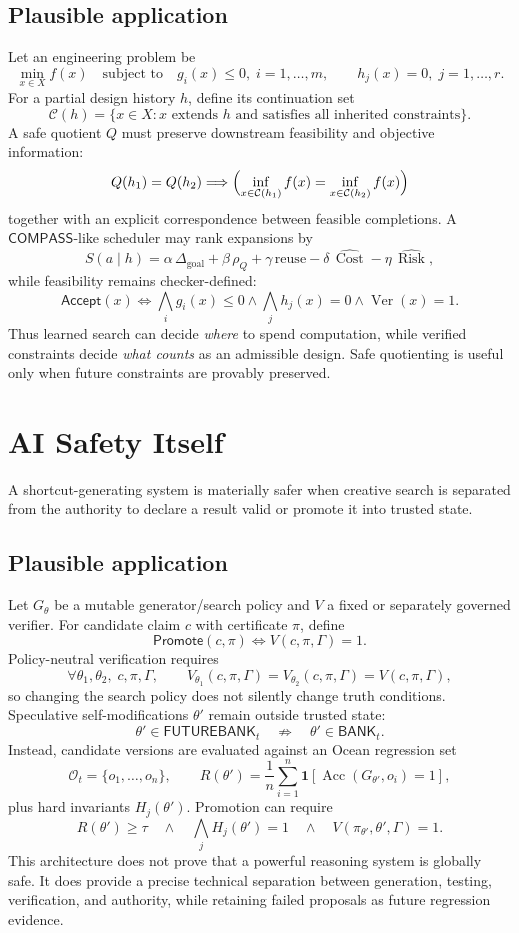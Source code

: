 \documentclass[11pt]{article}
\newcommand{\BANK}{\mathsf{BANK}}
\newcommand{\FB}{\mathsf{FUTUREBANK}}
\newcommand{\COMPASS}{\mathsf{COMPASS}}
\newcommand{\OCEAN}{\mathcal O}
\newcommand{\Acc}{\operatorname{Acc}}
\newcommand{\Ver}{\operatorname{Ver}}
\newcommand{\Cost}{\operatorname{Cost}}
\newcommand{\Risk}{\operatorname{Risk}}
\begin{document}
\subsection*{Plausible application}
Let an engineering problem be
\[
\min_{x\in X} f(x)
\quad\text{subject to}\quad
g_i(x)\le0,\;i=1,\dots,m,
\qquad
h_j(x)=0,\;j=1,\dots,r.
\]
For a partial design history \(h\), define its continuation set
\[
\mathcal C(h)=
\{x\in X:x\text{ extends }h\text{ and satisfies all inherited constraints}\}.
\]
A safe quotient \(Q\) must preserve downstream feasibility and objective information:
\[
Q(h_1)=Q(h_2)
\Longrightarrow
\Bigl(
\inf_{x\in\mathcal C(h_1)}f(x)
=
\inf_{x\in\mathcal C(h_2)}f(x)
\Bigr)
\]
together with an explicit correspondence between feasible completions. A \(\COMPASS\)-like scheduler
may rank expansions by
\[
S(a\mid h)=
\alpha\,\Delta_{\mathrm{goal}}
+\beta\,\rho_Q
+\gamma\,\mathrm{reuse}
-\delta\,\widehat{\Cost}
-\eta\,\widehat{\Risk},
\]
while feasibility remains checker-defined:
\[
\mathsf{Accept}(x)
\iff
\bigwedge_i g_i(x)\le0
\land
\bigwedge_j h_j(x)=0
\land
\Ver(x)=1.
\]
Thus learned search can decide \emph{where} to spend computation, while verified constraints decide
\emph{what counts} as an admissible design. Safe quotienting is useful only when future constraints are
provably preserved.

\section{AI Safety Itself}
A shortcut-generating system is materially safer when creative search is separated from the authority to
declare a result valid or promote it into trusted state.

\subsection*{Plausible application}
Let \(G_\theta\) be a mutable generator/search policy and \(V\) a fixed or separately governed verifier.
For candidate claim \(c\) with certificate \(\pi\), define
\[
\mathsf{Promote}(c,\pi)
\iff
V(c,\pi,\Gamma)=1.
\]
Policy-neutral verification requires
\[
\forall\theta_1,\theta_2,\;c,\pi,\Gamma,\qquad
V_{\theta_1}(c,\pi,\Gamma)=V_{\theta_2}(c,\pi,\Gamma)=V(c,\pi,\Gamma),
\]
so changing the search policy does not silently change truth conditions. Speculative self-modifications
\(\theta'\) remain outside trusted state:
\[
\theta'\in\FB_t
\quad\not\Rightarrow\quad
\theta'\in\BANK_t.
\]
Instead, candidate versions are evaluated against an Ocean regression set
\[
\OCEAN_t=\{o_1,\dots,o_n\},
\qquad
R(\theta')=\frac1n\sum_{i=1}^n
\mathbf 1\!\left[\Acc(G_{\theta'},o_i)=1\right],
\]
plus hard invariants \(H_j(\theta')\). Promotion can require
\[
R(\theta')\ge\tau
\quad\land\quad
\bigwedge_j H_j(\theta')=1
\quad\land\quad
V(\pi_{\theta'},\theta',\Gamma)=1.
\]
This architecture does not prove that a powerful reasoning system is globally safe. It does provide a
precise technical separation between generation, testing, verification, and authority, while retaining
failed proposals as future regression evidence.
\end{document}
